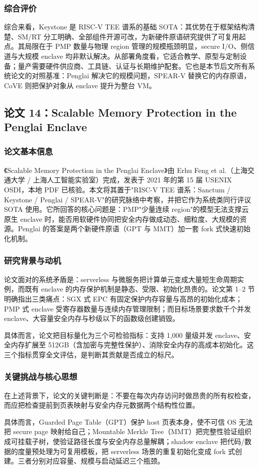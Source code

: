 \documentclass[11pt]{ctexart}
\begin{document}
\subsubsection{综合评价}
综合来看，Keystone 是 RISC-V TEE 谱系的基础 SOTA：其优势在于框架结构清楚、SM/RT 分工明确、全部组件开源可改，为新硬件原语研究提供了可复用起点。其局限在于 PMP 数量与物理 region 管理的规模瓶颈明显，secure I/O、侧信道与大规模 enclave 均非默认解决。从部署角度看，它适合教学、原型与定制设备；量产需要硬件供应商、工具链、认证与长期维护配套。它也是本节后文所有系统论文的对照基准：Penglai 解决它的规模问题，SPEAR-V 替换它的内存原语，CoVE 则把保护对象从 enclave 提升为整台 VM。\par
\subsection{论文 14：Scalable Memory Protection in the Penglai Enclave}
\subsubsection{论文基本信息}
《Scalable Memory Protection in the Penglai Enclave》由 Erhu Feng et al.（上海交通大学 / 上海人工智能实验室）完成，发表于 2021 年的第 15 届 USENIX OSDI，本地 PDF 已核验。本文将其置于"RISC-V TEE 谱系：Sanctum / Keystone / Penglai / SPEAR-V"的研究脉络中考察，并把它作为系统类同行评议 SOTA 使用。它所回答的核心问题是：PMP"少量连续 region"的模型无法支撑云原生 enclave 时，能否用软硬件协同把安全内存做成动态、细粒度、大规模的资源。Penglai 的答案是两个新硬件原语（GPT 与 MMT）加一套 fork 式快速初始化机制。\cite{feng2021penglai}\par
\subsubsection{研究背景与动机}
论文面对的系统矛盾是：serverless 与微服务把计算单元变成大量短生命周期实例，而既有 enclave 的内存保护机制是静态、受限、初始化昂贵的。论文第 1--2 节明确指出三类痛点：SGX 式 EPC 有固定保护内存容量与高昂的初始化成本；PMP 式 enclave 受寄存器数量与连续内存管理限制；而目标场景要求数千个并发 enclave、大容量安全内存与秒级以下的函数级创建销毁。\par
具体而言，论文把目标量化为三个可检验指标：支持 1,000 量级并发 enclave、安全内存扩展至 512GB（含加密与完整性保护）、消除安全内存的高成本初始化。这三个指标贯穿全文评估，是判断其贡献是否成立的标尺。\par
\subsubsection{关键挑战与核心思想}
在上述背景下，论文的关键判断是：不要在每次内存访问时做昂贵的所有权检查，而应把检查提前到页表映射与安全内存元数据两个结构性位置。\par
具体而言，Guarded Page Table（GPT）保护 host 页表本身，使不可信 OS 无法把 secure page 映射给自己；Mountable Merkle Tree（MMT）把完整性验证组织成可挂载子树，使验证路径长度与安全内存总量解耦；shadow enclave 把代码/数据的度量预处理为可复用模板，把 serverless 场景的重复初始化变成 fork 式创建。三者分别对应容量、规模与启动延迟三个瓶颈。\par
\end{document}
